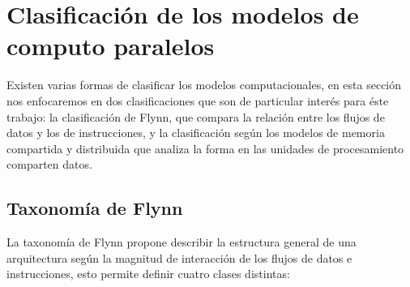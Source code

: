 
\section{Clasificación de los modelos de computo paralelos}

\label{mt_modelosparalelos}

Existen varias formas de clasificar los modelos computacionales, en esta
sección nos enfocaremos en dos clasificaciones que son de particular interés
para éste trabajo: la clasificación de Flynn, que compara la relación entre los
flujos de datos y los de instrucciones, y la clasificación según los modelos de
memoria compartida y distribuida que analiza la forma en las unidades de
procesamiento comparten datos.

\subsection{Taxonomía de Flynn}

La taxonomía de Flynn \cite{flynnstaxonomy1972} propone describir la estructura
general de una arquitectura según la magnitud de interacción de los flujos de
datos e instrucciones, esto permite definir cuatro clases distintas:

